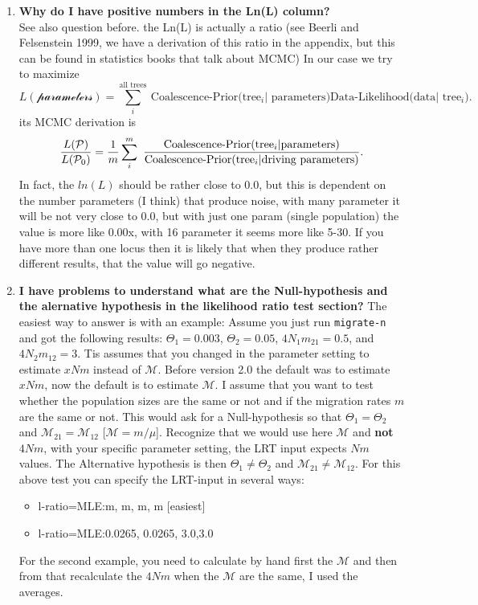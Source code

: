 \begin{enumerate}
\item {\bf  Why do I have positive numbers in the Ln(L) column? }\\
See also question before.
the Ln(L) is actually a ratio (see Beerli and Felsenstein 1999, we have a
derivation of this ratio in the appendix, but this can be found in 
statistics books that talk about MCMC)
In our case we try to maximize 
$$
L(\mathcal{\text{parameters}}) = \sum_i^{\text{all trees}}\ 
\text{Coalescence-Prior(tree$_i|$ parameters)} 
\text{Data-Likelihood(data$|$ tree$_i$)} .
$$
its MCMC derivation is 
$$
\frac{L(\P)}{L(\P_0)} = \frac{1}{m}\sum_i^m\ 
\frac{\text{Coalescence-Prior(tree$_i|$parameters)}}
{\text{Coalescence-Prior(tree$_i|$driving parameters)}} .
$$
In fact, the $ln(L)$ should be rather close to 0.0, 
but this is dependent on the number
parameters (I think) that produce noise, 
with many parameter it will be not very close
to 0.0, but with just one param (single population) the value
is more like 0.00x, with 16 parameter it seems more like 5-30. 
If you have more than one locus then it is likely that when 
they produce rather different results, that the value will go negative.

\item {\bf I have problems to understand what are the Null-hypothesis and the alernative hypothesis in the likelihood ratio test section?}
The easiest way to answer is with an example:
Assume you just run {\tt migrate-n} and got the following results:
$\Theta_1=0.003$, $\Theta_2=0.05$, $4N_1m_{21}=0.5$, and  
$4N_2m_{12}=3$. Tis assumes that you changed in the parameter setting to estimate $xNm$ instead of $\mathcal{M}$. Before version 2.0 the default was to estimate $xNm$, now the default is to estimate $\mathcal{M}$.   I assume that you want to test whether the population sizes are the 
same or not and if the migration rates $m$ are the same or not.
This would ask for a Null-hypothesis so that $\Theta_1=\Theta_2$ and
$\mathcal{M}_{21}=\mathcal{M}_{12}$ [$\mathcal{M}=m/\mu$]. 
Recognize that we would use here
$\mathcal{M}$ and {\bf not} $4Nm$, with your specific parameter setting, the LRT input expects $Nm$ values.
The Alternative hypothesis is then $\Theta_1 \ne \Theta_2$ and
$\mathcal{M}_{21} \ne \mathcal{M}_{12}$. For this above test you can specify the LRT-input in several ways:
\begin{itemize}
\item l-ratio=MLE:m, m, m, m [easiest]
\item l-ratio=MLE:0.0265, 0.0265, 3.0,3.0
\end{itemize}
For the second example, you need to calculate by hand first
the $\mathcal{M}$ and then from that recalculate the $4Nm$ when
the $\mathcal{M}$ are the same, I used the averages.


\end{enumerate}
